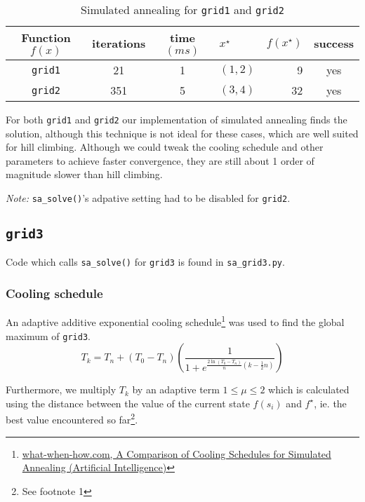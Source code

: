 \documentclass[11pt,oneside]{article}
\begin{document}
\begin{table}[h]
    \centering
    \caption{Simulated annealing for \texttt{grid1} and \texttt{grid2}}
\begin{tabular}{c|cclr|c}
    Function $f(x)$ & iterations & time $(ms)$ & $x^\star$ & $f(x^\star)$ & success \\
    \hline
    \texttt{grid1} & 21 & 1 & $(1,2)$ & 9 & yes \\
    \texttt{grid2} & 351 & 5 & $(3,4)$ & 32 & yes \\
\end{tabular}
\end{table}

For both \texttt{grid1} and \texttt{grid2} our implementation of simulated annealing
finds the solution, although this technique is not ideal for these cases, which are
well suited for hill climbing. Although we could tweak the cooling schedule and other
parameters to achieve faster convergence, they are still about 1 order of magnitude
slower than hill climbing.

\emph{Note:} \texttt{sa\_solve()}'s adpative setting had to be disabled for \texttt{grid2}.

\subsection{\texttt{grid3}}

Code which calls \texttt{sa\_solve()} for \texttt{grid3} is found in \texttt{sa\_grid3.py}.

\subsubsection{Cooling schedule}


An adaptive additive exponential cooling schedule\footnote{%
    \href{http://what-when-how.com/artificial-intelligence/a-comparison-of-cooling-schedules-for-simulated-annealing-artificial-intelligence/}%
    {what-when-how.com, A Comparison of Cooling Schedules for Simulated Annealing (Artificial Intelligence)}%
}
    was used to find the global maximum 
of \texttt{grid3}. 
\begin{equation}
    T_k = T_n + (T_0 - T_n)
    \left(\frac{1}{1+e^{\frac{2\ln\left(T_0-T_n\right)}{n}
    \left(k-\frac{1}{2}n\right)}}\right)
\end{equation}

Furthermore, we multiply $T_k$ by an adaptive term $1 \leq \mu \leq 2$ which
is calculated using the distance between the value of the current state $f(s_i)$ and
$f^\star$, ie. the best value encountered so far\footnote{See footnote 1}.
\end{document}
